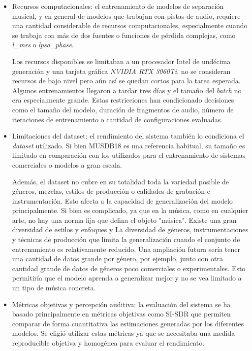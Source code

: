 \begin{itemize}
    \item Recursos computacionales: el entrenamiento de modelos de separación musical, y en general de modelos que trabajan con pistas de audio, requiere una cantidad considerable de recursos computacionales, especialmente cuando se trabaja con más de dos fuentes o funciones de pérdida complejas, como \textit{l\_mrs} o \textit{lpsa\_phase}.
    
    Los recursos disponibles se limitaban a un procesador Intel de undécima generación y una tarjeta gráfica \textit{NVIDIA RTX 3060Ti}, no se consideran recursos de bajo nivel pero aún así se quedan cortos para la tarea esperada. Algunos entrenamientos llegaron a tardar tres días y el tamaño del \textit{batch} no era especialmente grande. Estas restricciones han condicionado decisiones como el tamaño del modelo, duración de fragmentos de audio, número de iteraciones de entrenamiento o cantidad de configuraciones evaluadas.
    
    \item Limitaciones del dataset: el rendimiento del sistema también lo condiciona el \textit{dataset} utilizado. Si bien MUSDB18 es una referencia habitual, su tamaño es limitado en comparación con los utilizados para el entrenamiento de sistemas comerciales o modelos a gran escala.
    
    Además, el dataset no cubre en su totalidad toda la variedad posible de géneros, mezclas, estilos de producción o calidades de grabación e instrumentación. Esto afecta a la capacidad de generalización del modelo principalmente. Si bien es complicado, ya que en la música, como en cualquier arte, no hay una norma fija que defina el objeto "música". Existe una gran diversidad de estilos y enfoques y La diversidad de géneros, instrumentaciones y técnicas de producción que limita la generalización cuando el conjunto de entrenamiento es relativamente reducido. Una ampliación futura sería tener una cantidad de datos grande por género, por ejemplo, junto con otra cantidad grande de datos de géneros poco comerciales o experimentales. Esto permitiría que el modelo aprenda a generalizar mejor y no se vea limitado a un tipo de música concreta.

    \item Métricas objetivas y percepción auditiva: la evaluación del sistema se ha basado principalmente en métricas objetivas como SI-SDR que permiten comparar de forma cuantitativa las estimaciones generadas por los diferentes modelos. Se eligió utilizar estas métricas ya que se necesitaba una medida reproducible objetiva y homogénea para evaluar el rendimiento.
    

\end{itemize}
